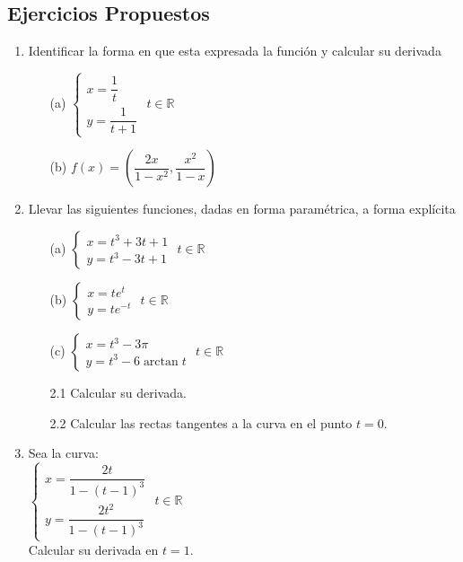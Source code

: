 \documentclass[10pt,twoside]{SelfArx} %
\begin{document}
\subsection{Ejercicios Propuestos}
\begin{enumerate}
	\item 	Identificar la forma en que esta expresada la funci\'on y calcular su derivada
	\begin{enumerate}
		\item[(a)]	$ \begin{cases}
		x=\dfrac{1}{t}\\
		y=\dfrac{1}{t+1}
		\end{cases} $ $ t\in \mathbb{R} $
		\item[(b)]	$ f(x)=\left (\dfrac{2x}{1-x^{2}},\dfrac{x^{2}}{1-x}\right  ) $

	\end{enumerate}


	\item 	Llevar las siguientes funciones, dadas en forma param\'etrica, a forma expl\'icita
	\begin{enumerate}
		\item[(a)]	$ \begin{cases}
			x=t^{3}+3t+1\\
			y=t^{3}-3t+1
		\end{cases} $ $ t\in \mathbb{R} $
		\item[(b)]$ \begin{cases}
			x=te^{t}\\
			y=te^{-t}
			\end{cases} $ $ t\in \mathbb{R} $
		\item[(c)]$ \begin{cases}
			x=t^{3}-3\pi\\
			y=t^{3}-6\arctan t
			\end{cases} $ $ t\in \mathbb{R} $
	\end{enumerate}
	\begin{enumerate}
		\item[2.1]	Calcular su derivada.
		\item[2.2]	Calcular las rectas tangentes a la curva en el punto $ t=0 $.
	\end{enumerate}
	\item	Sea la curva:\\
	
	$ \begin{cases}
	x=\dfrac{2t}{1-(t-1)^{3}}\\
	y=\dfrac{2t^{2}}{1-(t-1)^{3}}
	\end{cases} $
	$ t\in\mathbb{R} $\\
	Calcular su derivada en $ t=1 $.
	

\end{enumerate}
\end{document}
